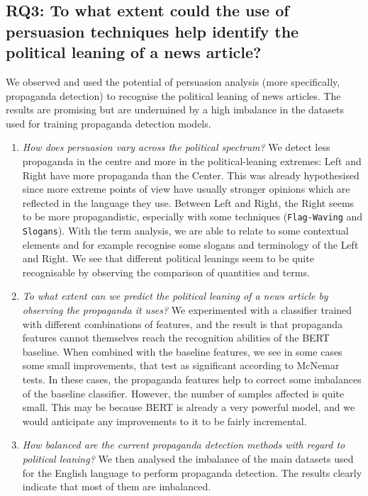 \subsection*{RQ3: To what extent could the use of persuasion techniques help identify the political leaning of a news article?}

We observed and used the potential of persuasion analysis (more specifically, propaganda detection) to recognise the political leaning of news articles. The results are promising but are undermined by a high imbalance in the datasets used for training propaganda detection models.

\begin{enumerate}[label={\textbf{RQ3.\arabic*:}},leftmargin=2cm]
    \item \emph{How does persuasion vary across the political spectrum?} We detect less propaganda in the centre and more in the political-leaning extremes: %
    Left and Right have more propaganda than the Center.
    This was already hypothesised since more extreme points of view have usually stronger opinions which are reflected in the language they use. Between Left and Right, the Right seems to be more propagandistic, especially with some techniques (\texttt{Flag-Waving} and \texttt{Slogans}). With the term analysis, we are able to relate to some contextual elements and for example recognise some slogans and terminology of the Left and Right. We see that different political leanings seem to be quite recognisable by observing the comparison of quantities and terms.
    \item \emph{To what extent can we predict the political leaning of a news article by observing the propaganda it uses?} We experimented with a classifier trained with different combinations of features, and the result is that propaganda features cannot themselves reach the recognition abilities of the BERT baseline. When combined with the baseline features, we see in some cases some small improvements, that test as significant according to McNemar tests. In these cases, the propaganda features help to correct some imbalances of the baseline classifier. However, the number of samples affected is quite small. This may be because BERT is already a very powerful model, and we would anticipate any improvements to it to be fairly incremental.
    \item \emph{How balanced are the current propaganda detection methods with regard to political leaning?} We then analysed the imbalance of the main datasets used for the English language to perform propaganda detection. The results clearly indicate that most of them are imbalanced.

\end{enumerate}
